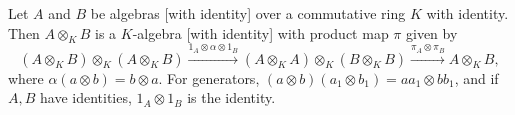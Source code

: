 Let $A$ and $B$ be algebras [with identity] over a commutative ring $K$ with identity. Then $A \otimes_K B$ is a $K$-algebra [with identity] with product map $\pi$ given by
\[
(A \otimes_K B) \otimes_K (A \otimes_K B) \xrightarrow{1_A \otimes \alpha \otimes 1_B} (A \otimes_K A) \otimes_K (B \otimes_K B) \xrightarrow{\pi_A \otimes \pi_B} A \otimes_K B,
\]
where $\alpha(a \otimes b) = b \otimes a$. For generators, $(a \otimes b)(a_1 \otimes b_1) = aa_1 \otimes bb_1$, and if $A,B$ have identities, $1_A \otimes 1_B$ is the identity.
